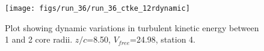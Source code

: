 \begin{figure}[H]
\centering
\texttt{[image: figs/run\_36/run\_36\_ctke\_12rdynamic]}
\caption{Plot showing dynamic variations in turbulent kinetic energy between 1 and 2 core radii. $z/c$=8.50, $V_{free}$=24.98, station 4.}
\label{fig:run_36_ctke_12rdynamic}
\end{figure}


